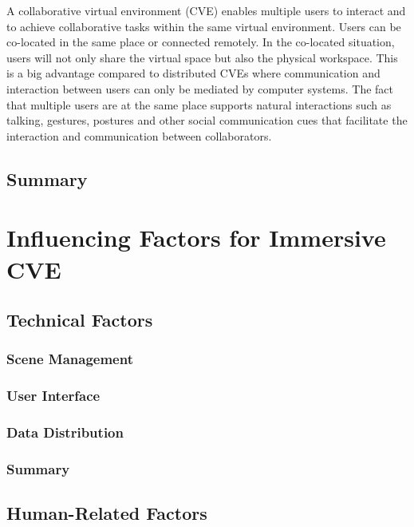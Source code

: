 A collaborative virtual environment (CVE) \citep{Benford2001CVE} enables multiple users to interact \citep{Schroeder2006Usability} and to achieve collaborative tasks \citep{Dodds2009Using} within the same virtual environment. Users can be co-located in the same place or connected remotely. In the co-located situation, users will not only share the virtual space but also the physical workspace. This is a big advantage compared to distributed CVEs where communication and interaction between users can only be mediated by computer systems. The fact that multiple users are at the same place supports natural interactions such as talking, gestures, postures and other social communication cues that facilitate the interaction and communication between collaborators.



\subsection{Summary}

\section{Influencing Factors for Immersive CVE}
\subsection{Technical Factors}

\subsubsection{Scene Management}

\subsubsection{User Interface}

\subsubsection{Data Distribution}

\subsubsection{Summary}

\subsection{Human-Related Factors}

